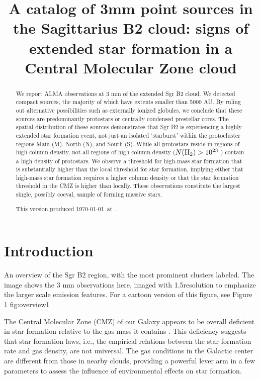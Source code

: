 \documentclass[twocolumn]{aastex61}
\begin{document}
\title{A catalog of 3mm point sources in the Sagittarius B2 cloud: signs of
extended star formation in a Central Molecular Zone cloud}

\begin{abstract}
We report ALMA observations at 3 mm  of the extended Sgr B2 cloud. We detected
\ncores compact sources, the majority of which have extents smaller than 5000
AU.  By ruling out alternative possibilities such as externally ionized
globules, we conclude that these sources are predominantly protostars or
centrally condensed prestellar cores.  The spatial distribution of these
sources demonstrates that Sgr B2 is experiencing a highly extended star
formation event, not just an isolated `starburst' within the protocluster
regions Main (M), North (N), and South (S).  While all protostars reside in
regions of high column density, not all regions of high column density
($N(\textrm{H}_{2})>10^{23}$ \persc)
contain a high density of
protostars.  We observe a threshold for high-mass star formation that is
substantially higher than the local threshold for star formation, implying
either that high-mass star formation requires a higher column density or that
the star formation threshold in the CMZ is higher than locally.  These
observations constitute the largest single, possibly coeval, sample of forming
massive stars.

This version produced \today\ at \currenttime.
\end{abstract}




\section{Introduction}

{An overview of the Sgr B2 region, with the most prominent clusters labeled.
The image shows the 3 mm observations here, imaged with 1.5\arcsec resolution
to emphasize the larger scale emission features.  For a cartoon version of this
figure, see \citet{Schmiedeke2016a} Figure 1}
{fig:overview}{1}{\textwidth}

The Central Molecular Zone (CMZ) of our Galaxy appears to be overall deficient
in star formation relative to the gas mass it contains \citep{Longmore2013a,
Kauffmann2016a,Kauffmann2016b,Barnes2016c,Barnes2017b}.  This deficiency
suggests that star formation laws, i.e., the empirical relations between
the star formation rate and gas density, are not universal.  The gas
conditions in the Galactic center are different from those in nearby clouds,
providing a powerful lever arm in a few
parameters \citep[e.g., pressure, temperature, velocity
dispersion][]{Ginsburg2016a,Immer2016a,Shetty2012a,Henshaw2016a} to assess the
influence of environmental effects on star formation.
\end{document}
